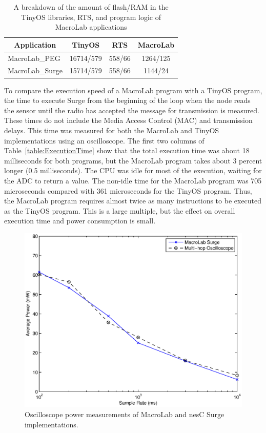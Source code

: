 \begin{table}[!htb]
  \centering
  \begin{minipage}{\columnwidth}
    \centering
    \begin{tabular}{|l|c|c|c|}
      \hline
      \multicolumn{1}{|c}{Application} & \multicolumn{1}{|c|}{TinyOS} & \multicolumn{1}{c|}{RTS} & \multicolumn{1}{c|}{MacroLab}\\
      \hline
      MacroLab\_PEG&16714/579&558/66&1264/125\\
      MacroLab\_Surge&15714/579&558/66&1144/24\\
      \hline
    \end{tabular}
  \end{minipage}
  \caption[MacroLab memory footprint]{A breakdown of the amount of flash/RAM in the TinyOS libraries, RTS,
  and program logic of MacroLab applications}
  \label{table:CodeBreakdown}
\end{table}

To compare the execution speed of a MacroLab program with a TinyOS program, the
time to execute Surge from the beginning of the loop when the node reads the
sensor until the radio has accepted the message for transmission is measured.
These times do not include the Media Access Control (MAC) and transmission
delays.  This time was measured for both the MacroLab and TinyOS implementations
using an oscilloscope.  The first two columns of Table~\ref{table:ExecutionTime}
show that the total execution time was about 18 milliseconds for both programs,
but the MacroLab program takes about 3 percent longer (0.5 milliseconds).  The
CPU was idle for most of the execution, waiting for the ADC to return a value.
The non-idle time for the MacroLab program was 705 microseconds compared with
361 microseconds for the TinyOS program.  Thus, the MacroLab program requires
almost twice as many instructions to be executed as the TinyOS program.  This is
a large multiple, but the effect on overall execution time and power consumption
is small.

\begin{figure}
  \centering
  \includegraphics[width=0.6\columnwidth]{fig/SurgePower}
  \caption{Oscilloscope power measurements of MacroLab and nesC Surge
  implementations.} 
  \label{fig:macrolabPowerConsumption}
\end{figure}

